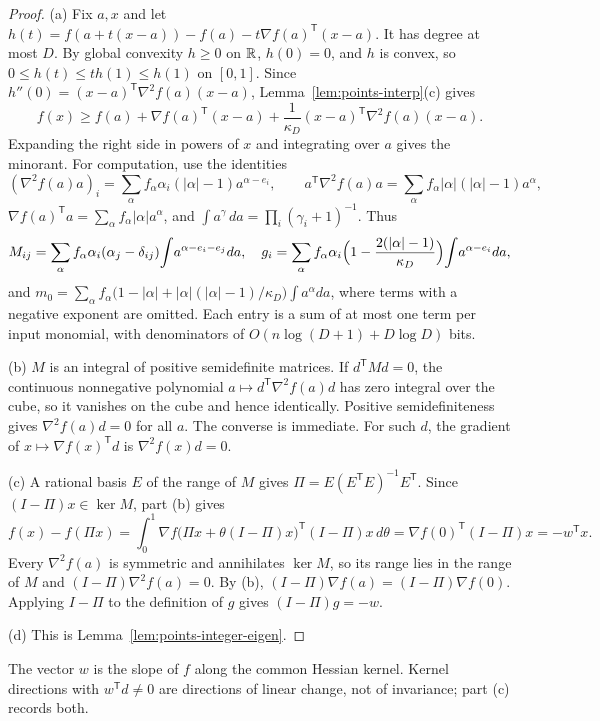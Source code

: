 \begin{proof}
(a) Fix $a,x$ and let
$h(t)=f(a+t(x-a))-f(a)-t\nabla f(a)^{\mathsf T}(x-a)$. It has degree at
most $D$. By global convexity $h\ge0$ on $\mathbb R$, $h(0)=0$, and $h$ is convex,
so $0\le h(t)\le th(1)\le h(1)$ on $[0,1]$. Since
$h''(0)=(x-a)^{\mathsf T}\nabla^2f(a)(x-a)$,
Lemma~\ref{lem:points-interp}(c) gives
\[
 f(x)\ge f(a)+\nabla f(a)^{\mathsf T}(x-a)+
 \frac1{\kappa_D}(x-a)^{\mathsf T}\nabla^2f(a)(x-a).
\]
Expanding the right side in powers of $x$ and integrating over $a$ gives
the minorant. For computation, use the identities
\[
 (\nabla^2f(a)a)_i=\sum_\alpha f_\alpha\alpha_i(|\alpha|-1)a^{\alpha-e_i},
 \qquad
 a^{\mathsf T}\nabla^2f(a)a=\sum_\alpha f_\alpha|\alpha|(|\alpha|-1)a^\alpha,
\]
$\nabla f(a)^{\mathsf T}a=\sum_\alpha f_\alpha|\alpha|a^\alpha$, and
$\int a^\gamma\,da=\prod_i(\gamma_i+1)^{-1}$. Thus
\[
 M_{ij}=\sum_\alpha f_\alpha\alpha_i(\alpha_j-\delta_{ij})
 \!\int\! a^{\alpha-e_i-e_j}da,\quad
 g_i=\sum_\alpha f_\alpha\alpha_i\Bigl(1-\frac{2(|\alpha|-1)}{\kappa_D}\Bigr)
 \!\int\! a^{\alpha-e_i}da,
\]
and
$m_0=\sum_\alpha f_\alpha\bigl(1-|\alpha|+|\alpha|(|\alpha|-1)/\kappa_D\bigr)
\int a^\alpha da$, where terms with a negative exponent are omitted. Each
entry is a sum of at most one term per input monomial, with denominators
of $O(n\log(D+1)+D\log D)$ bits.

(b) $M$ is an integral of positive semidefinite matrices. If
$d^{\mathsf T}Md=0$, the continuous nonnegative polynomial
$a\mapsto d^{\mathsf T}\nabla^2f(a)d$ has zero integral over the cube, so it
vanishes on the cube and hence identically. Positive semidefiniteness gives
$\nabla^2f(a)d=0$ for all $a$. The converse is immediate. For such $d$, the
gradient of $x\mapsto\nabla f(x)^{\mathsf T}d$ is $\nabla^2f(x)d=0$.

(c) A rational basis $E$ of the range of $M$ gives
$\Pi=E(E^{\mathsf T}E)^{-1}E^{\mathsf T}$. Since $(I-\Pi)x\in\ker M$, part
(b) gives
\[
 f(x)-f(\Pi x)=\int_0^1\nabla f\bigl(\Pi x+\theta(I-\Pi)x\bigr)^{\mathsf T}
 (I-\Pi)x\,d\theta=\nabla f(0)^{\mathsf T}(I-\Pi)x=-w^{\mathsf T}x .
\]
Every $\nabla^2f(a)$ is symmetric and annihilates $\ker M$, so its range
lies in the range of $M$ and $(I-\Pi)\nabla^2f(a)=0$. By (b),
$(I-\Pi)\nabla f(a)=(I-\Pi)\nabla f(0)$. Applying $I-\Pi$ to the definition
of $g$ gives $(I-\Pi)g=-w$.

(d) This is Lemma~\ref{lem:points-integer-eigen}.
\end{proof}

The vector $w$ is the slope of $f$ along the common Hessian kernel. Kernel
directions with $w^{\mathsf T}d\ne0$ are directions of linear change, not
of invariance; part (c) records both.


